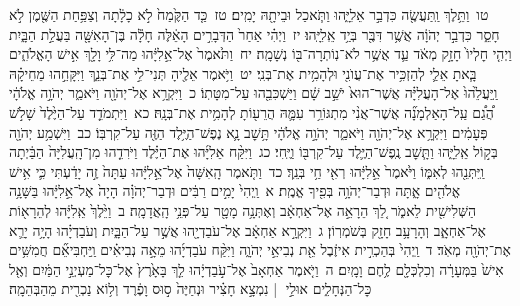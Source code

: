 \documentclass[18pt]{article}
\newcommand{\kri}[1]{\Afootnote{#1}}	%
\begin{document}
 {\loc טו~}וַתֵּ֥לֶךְ וַֽתַּעֲשֶׂ֖ה כִּדְבַ֣ר אֵלִיָּ֑הוּ וַתֹּ֧אכַל  \edtext{(הוא והיא)}{\kri{קרי: הִֽיא־וָה֛וּא}}  וּבֵיתָ֖הּ יָמִֽים׃ \startlock
 {\loc טז~}כַּ֤ד הַקֶּ֙מַח֙ לֹ֣א כָלָ֔תָה וְצַפַּ֥חַת הַשֶּׁ֖מֶן לֹ֣א חָסֵ֑ר כִּדְבַ֣ר יְהֹוָ֔ה אֲשֶׁ֥ר דִּבֶּ֖ר בְּיַ֥ד אֵֽלִיָּֽהוּ׃ \startlock
 {\loc יז~}וַיְהִ֗י אַחַר֙ הַדְּבָרִ֣ים הָאֵ֔לֶּה חָלָ֕ה בֶּן־הָאִשָּׁ֖ה בַּעֲלַ֣ת הַבָּ֑יִת וַיְהִ֤י חׇלְיוֹ֙ חָזָ֣ק מְאֹ֔ד עַ֛ד אֲשֶׁ֥ר לֹא־נֽוֹתְרָה־בּ֖וֹ נְשָׁמָֽה׃ \startlock
 {\loc יח~}וַתֹּ֙אמֶר֙ אֶל־אֵ֣לִיָּ֔הוּ מַה־לִּ֥י וָלָ֖ךְ אִ֣ישׁ הָאֱלֹהִ֑ים בָּ֧אתָ אֵלַ֛י לְהַזְכִּ֥יר אֶת־עֲוֺנִ֖י וּלְהָמִ֥ית אֶת־בְּנִֽי׃ \startlock
 {\loc יט~}וַיֹּ֥אמֶר אֵלֶ֖יהָ תְּנִי־לִ֣י אֶת־בְּנֵ֑ךְ וַיִּקָּחֵ֣הוּ מֵחֵיקָ֗הּ וַֽיַּעֲלֵ֙הוּ֙ אֶל־הָעֲלִיָּ֗ה אֲשֶׁר־הוּא֙ יֹשֵׁ֣ב שָׁ֔ם וַיַּשְׁכִּבֵ֖הוּ עַל־מִטָּתֽוֹ׃ \startlock
 {\loc כ~}וַיִּקְרָ֥א אֶל־יְהֹוָ֖ה וַיֹּאמַ֑ר יְהֹוָ֣ה אֱלֹהָ֔י הֲ֠גַ֠ם עַֽל־הָאַלְמָנָ֞ה אֲשֶׁר־אֲנִ֨י מִתְגּוֹרֵ֥ר עִמָּ֛הּ הֲרֵע֖וֹתָ לְהָמִ֥ית אֶת־בְּנָֽהּ׃ \startlock
 {\loc כא~}וַיִּתְמֹדֵ֤ד עַל־הַיֶּ֙לֶד֙ שָׁלֹ֣שׁ פְּעָמִ֔ים וַיִּקְרָ֥א אֶל־יְהֹוָ֖ה וַיֹּאמַ֑ר יְהֹוָ֣ה אֱלֹהָ֔י תָּ֥שׇׁב נָ֛א נֶפֶשׁ־הַיֶּ֥לֶד הַזֶּ֖ה עַל־קִרְבּֽוֹ׃ \startlock
 {\loc כב~}וַיִּשְׁמַ֥ע יְהֹוָ֖ה בְּק֣וֹל אֵֽלִיָּ֑הוּ וַתָּ֧שׇׁב נֶֽפֶשׁ־הַיֶּ֛לֶד עַל־קִרְבּ֖וֹ וַיֶּֽחִי׃ \startlock
 {\loc כג~}וַיִּקַּ֨ח אֵלִיָּ֜הוּ אֶת־הַיֶּ֗לֶד וַיֹּרִדֵ֤הוּ מִן־הָֽעֲלִיָּה֙ הַבַּ֔יְתָה וַֽיִּתְּנֵ֖הוּ לְאִמּ֑וֹ וַיֹּ֙אמֶר֙ אֵ֣לִיָּ֔הוּ רְאִ֖י חַ֥י בְּנֵֽךְ׃ \startlock
 {\loc כד~}וַתֹּ֤אמֶר הָֽאִשָּׁה֙ אֶל־אֵ֣לִיָּ֔הוּ עַתָּה֙ זֶ֣ה יָדַ֔עְתִּי כִּ֛י אִ֥ישׁ אֱלֹהִ֖ים אָ֑תָּה וּדְבַר־יְהֹוָ֥ה בְּפִ֖יךָ אֱמֶֽת׃ 
\startlock
 {\loc א~}וַֽיְהִי֙ יָמִ֣ים רַבִּ֔ים וּדְבַר־יְהֹוָ֗ה הָיָה֙ אֶל־אֵ֣לִיָּ֔הוּ בַּשָּׁנָ֥ה הַשְּׁלִישִׁ֖ית לֵאמֹ֑ר לֵ֚ךְ הֵרָאֵ֣ה אֶל־אַחְאָ֔ב וְאֶתְּנָ֥ה מָטָ֖ר עַל־פְּנֵ֥י הָֽאֲדָמָֽה׃ \startlock
 {\loc ב~}וַיֵּ֙לֶךְ֙ אֵֽלִיָּ֔הוּ לְהֵרָא֖וֹת אֶל־אַחְאָ֑ב וְהָרָעָ֥ב חָזָ֖ק בְּשֹׁמְרֽוֹן׃ \startlock
 {\loc ג~}וַיִּקְרָ֣א אַחְאָ֔ב אֶל־עֹבַדְיָ֖הוּ אֲשֶׁ֣ר עַל־הַבָּ֑יִת וְעֹבַדְיָ֗הוּ הָיָ֥ה יָרֵ֛א אֶת־יְהֹוָ֖ה מְאֹֽד׃ \startlock
 {\loc ד~}וַֽיְהִי֙ בְּהַכְרִ֣ית אִיזֶ֔בֶל אֵ֖ת נְבִיאֵ֣י יְהֹוָ֑ה וַיִּקַּ֨ח עֹבַדְיָ֜הוּ מֵאָ֣ה נְבִיאִ֗ים וַֽיַּחְבִּיאֵ֞ם חֲמִשִּׁ֥ים אִישׁ֙ בַּמְּעָרָ֔ה וְכִלְכְּלָ֖ם לֶ֥חֶם וָמָֽיִם׃ \startlock
 {\loc ה~}וַיֹּ֤אמֶר אַחְאָב֙ אֶל־עֹ֣בַדְיָ֔הוּ לֵ֤ךְ בָּאָ֙רֶץ֙ אֶל־כׇּל־מַעְיְנֵ֣י הַמַּ֔יִם וְאֶ֖ל כׇּל־הַנְּחָלִ֑ים אוּלַ֣י  |  נִמְצָ֣א חָצִ֗יר וּנְחַיֶּה֙ ס֣וּס וָפֶ֔רֶד וְל֥וֹא נַכְרִ֖ית מֵהַבְּהֵמָֽה׃ \startlock
\end{document}
